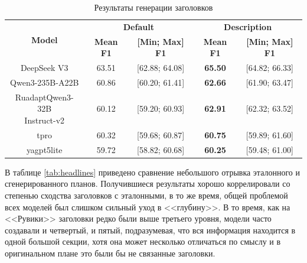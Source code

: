 \documentclass{article}
\theoremstyle{definition}
\theoremstyle{plain}
\begin{document}
\begin{table}[ht!]
\centering
\caption{Результаты генерации заголовков}
\begin{tabular}{c|cc|cc}
\hline
\multirow{2}{*}{\textbf{Model}} & \multicolumn{2}{c|}{\textbf{Default}} & \multicolumn{2}{c}{\textbf{Description}} \\
 & \textbf{Mean F1} & \textbf{[Min; Max] F1} & \textbf{Mean F1} & \textbf{[Min; Max] F1} \\
\hline
DeepSeek V3                               & 63.51 & [62.88; 64.08] & \textbf{65.50} & [64.82; 66.33] \\
Qwen3-235B-A22B                           & 60.86 & [60.20; 61.41] & \textbf{62.66} & [61.90; 63.47] \\
\hline
\makecell{RuadaptQwen3-32B\\Instruct-v2}  & 60.12 & [59.20; 60.93] & \textbf{62.91} & [62.32; 63.52] \\
\hline
tpro                                      & 60.32 & [59.68; 60.87] & \textbf{60.75} & [59.89; 61.60] \\
yagpt5lite                                & 59.72 & [58.82; 60.68] & \textbf{60.25} & [59.48; 61.00] \\
\hline
\end{tabular}
\end{table}

В таблице \ref{tab:headlines} приведено сравнение небольшого отрывка эталонного и сгенерированного планов.
Получившиеся результаты хорошо коррелировали со степенью сходства заголовков с эталонными, в то же время, общей проблемой всех моделей был слишком сильный уход в <<глубину>>. 
В то время, как на <<Рувики>> заголовки редко были выше третьего уровня, модели часто создавали и четвертый, и пятый, подразумевая, что вся информация находится в одной большой секции, хотя
она может несколько отличаться по смыслу и в оригинальном плане это были бы не связанные заголовки.
\end{document}
